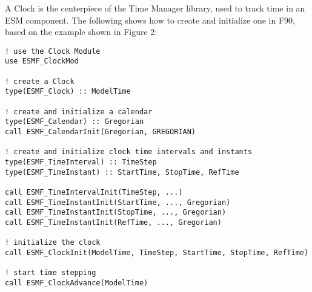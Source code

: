 
A Clock is the centerpiece of the Time Manager library, used to track time
in an ESM component.  The following shows how to create and initialize one
in F90, based on the example shown in Figure 2:

\begin{verbatim}
! use the Clock Module
use ESMF_ClockMod

! create a Clock
type(ESMF_Clock) :: ModelTime

! create and initialize a calendar
type(ESMF_Calendar) :: Gregorian
call ESMF_CalendarInit(Gregorian, GREGORIAN)

! create and initialize clock time intervals and instants
type(ESMF_TimeInterval) :: TimeStep
type(ESMF_TimeInstant) :: StartTime, StopTime, RefTime

call ESMF_TimeIntervalInit(TimeStep, ...)
call ESMF_TimeInstantInit(StartTime, ..., Gregorian)
call ESMF_TimeInstantInit(StopTime, ..., Gregorian)
call ESMF_TimeInstantInit(RefTime, ..., Gregorian)

! initialize the clock
call ESMF_ClockInit(ModelTime, TimeStep, StartTime, StopTime, RefTime)

! start time stepping
call ESMF_ClockAdvance(ModelTime)
\end{verbatim}
